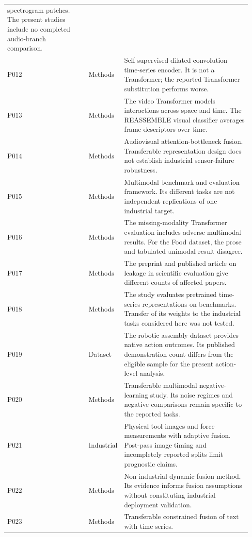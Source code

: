 \begin{longtable}{@{}P{.25\textwidth}P{.16\textwidth}P{.53\textwidth}@{}}
spectrogram patches. The present studies include no completed audio-branch comparison.
\\
P012 \parencite{P012} & Methods & Self-supervised dilated-convolution time-series encoder.
It is not a Transformer; the reported Transformer substitution performs worse. \\
P013 \parencite{P013} & Methods & The video Transformer models interactions across space and
time. The REASSEMBLE visual classifier averages frame descriptors over time. \\
P014 \parencite{Nagrani2021MBT} & Methods & Audiovisual attention-bottleneck fusion.
Transferable representation design does not establish industrial sensor-failure
robustness. \\
P015 \parencite{P015} & Methods & Multimodal benchmark and evaluation framework. Its
different tasks are not independent replications of one industrial target. \\
P016 \parencite{P016} & Methods & The missing-modality Transformer evaluation includes
adverse multimodal results. For the Food dataset, the prose and tabulated unimodal
result disagree. \\
P017 \parencite{P017} & Methods & The preprint and published article on leakage in
scientific evaluation give different counts of affected papers. \\
P018 \parencite{P018} & Methods & The study evaluates pretrained time-series representations
on benchmarks. Transfer of its weights to the industrial tasks considered here was not
tested. \\
P019 \parencite{Sliwowski2025REASSEMBLE} & Dataset & The robotic assembly dataset provides
native action outcomes. Its published demonstration count differs from the eligible
sample for the present action-level analysis. \\
P020 \parencite{P020} & Methods & Transferable multimodal negative-learning study. Its noise
regimes and negative comparisons remain specific to the reported tasks. \\
P021 \parencite{P021} & Industrial & Physical tool images and force measurements with
adaptive fusion. Post-pass image timing and incompletely reported splits limit
prognostic claims. \\
P022 \parencite{P022} & Methods & Non-industrial dynamic-fusion method. Its evidence informs
fusion assumptions without constituting industrial deployment validation. \\
P023 \parencite{P023} & Methods & Transferable constrained fusion of text with time series.

\end{longtable}
